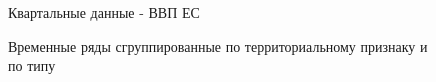 \documentclass[12pt,a4paper, oneside]{extreport}
\begin{document}
\begin{figure}[H]
	\caption{Временные ряды сгруппированные по территориальному признаку и  по типу }
	\label{qwe}
	
	\centering\footnotesize{Квартальные данные - ВВП ЕС  }
	
	\begin{minipage}[H]{0.4\linewidth}
	\end{minipage}
	\begin{minipage}[H]{0.4\linewidth}
	\end{minipage}
	

\end{figure}
\end{document}
